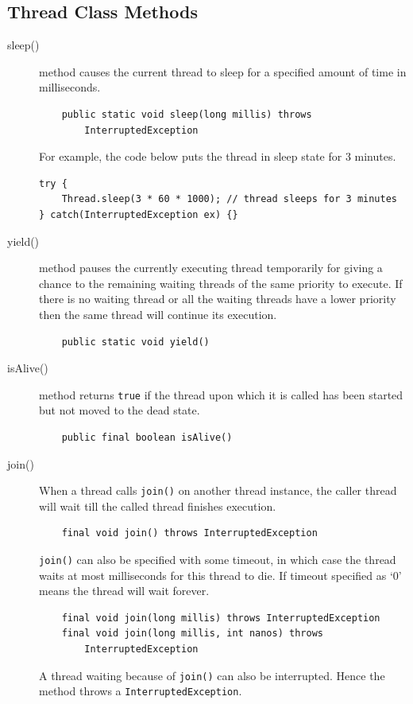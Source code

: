 \documentclass[11pt,a4paper]{article}
\begin{document}
\subsection*{Thread Class Methods}
\begin{description}
\item [sleep()] method causes the current thread to sleep for a specified amount of time in milliseconds.
\begin{verbatim}
    public static void sleep(long millis) throws 
        InterruptedException
\end{verbatim}
For example, the code below puts the thread in sleep state for 3 minutes.
\begin{lstlisting}[numbers=none]
try {
    Thread.sleep(3 * 60 * 1000); // thread sleeps for 3 minutes
} catch(InterruptedException ex) {}
\end{lstlisting}
\item [yield()] method pauses the currently executing thread temporarily for giving a chance to the remaining waiting threads of the same priority to execute. If there is no waiting thread or all the waiting threads have a lower priority then the same thread will continue its execution.
\begin{verbatim}
    public static void yield()
\end{verbatim}
\item [isAlive()] method returns \lstinline{true} if the thread upon which it is called has been started but not moved to the dead state.
\begin{verbatim}
    public final boolean isAlive()
\end{verbatim}
\item [join()] When a thread calls \texttt{join()} on another thread instance, the caller thread will wait till the called thread finishes execution.
\begin{verbatim}
    final void join() throws InterruptedException
\end{verbatim}
\texttt{join()} can also be specified with some timeout, in which case the thread waits at most milliseconds for this thread to die. If timeout specified as `0' means the thread will wait forever.
\begin{verbatim}
    final void join(long millis) throws InterruptedException
    final void join(long millis, int nanos) throws 
        InterruptedException
\end{verbatim}
A thread waiting because of \texttt{join()} can also be interrupted. Hence the method throws a \texttt{InterruptedException}.
\end{description}
\end{document}
